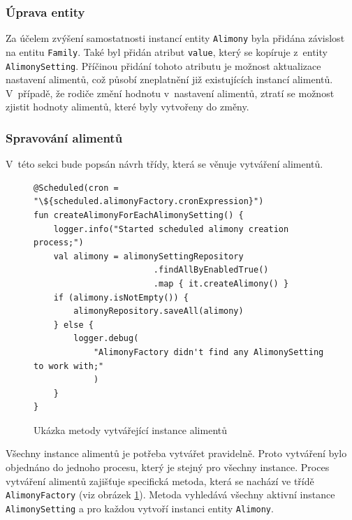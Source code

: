         \subsubsection{Úprava entity}
            Za účelem zvýšení samostatnosti instancí entity \verb|Alimony| byla přidána závislost na entitu \verb|Family|. Také byl přidán atribut \verb|value|, který se kopíruje z~entity \verb|AlimonySetting|. Příčinou přidání tohoto atributu je možnost aktualizace nastavení alimentů, což působí zneplatnění již existujících instancí alimentů. V~případě, že rodiče změní hodnotu v~nastavení alimentů, ztratí se možnost zjistit hodnoty alimentů, které byly vytvořeny do změny.
            
        \subsubsection{Spravování alimentů} 
            V~této sekci bude popsán návrh třídy, která se věnuje vytváření alimentů.
            \begin{figure}
                \begin{verbatim}
@Scheduled(cron = "\${scheduled.alimonyFactory.cronExpression}")
fun createAlimonyForEachAlimonySetting() {
    logger.info("Started scheduled alimony creation process;")
    val alimony = alimonySettingRepository
                        .findAllByEnabledTrue()
                        .map { it.createAlimony() }
    if (alimony.isNotEmpty()) {
        alimonyRepository.saveAll(alimony)
    } else {
        logger.debug(
            "AlimonyFactory didn't find any AlimonySetting to work with;"
            )
    }
}
                \end{verbatim}
                \caption{Ukázka metody vytvářející instance alimentů} 
                \label{code:create-alimony}
            \end{figure}
            Všechny instance alimentů je potřeba vytvářet pravidelně. Proto vytváření bylo objednáno do jednoho procesu, který je stejný pro všechny instance. Proces vytváření alimentů zajišťuje specifická metoda, která se nachází ve třídě \verb|AlimonyFactory| (viz obrázek \ref{code:create-alimony}). Metoda vyhledává všechny aktivní instance \verb|AlimonySetting| a pro každou vytvoří instanci entity \verb|Alimony|. 
            
